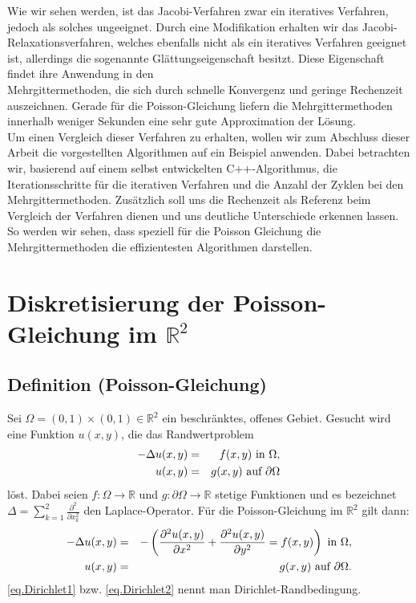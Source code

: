 Wie wir sehen werden, ist das Jacobi-Verfahren zwar ein iteratives Verfahren, jedoch als solches ungeeignet. Durch eine Modifikation erhalten wir das Jacobi-Relaxationsverfahren, welches ebenfalls nicht als ein iteratives Verfahren geeignet ist, allerdings die sogenannte Glättungseigenschaft besitzt. Diese Eigenschaft findet ihre Anwendung in den\\ Mehrgittermethoden, die sich durch schnelle Konvergenz und geringe Rechenzeit auszeichnen. Gerade für die Poisson-Gleichung liefern die Mehrgittermethoden innerhalb weniger Sekunden eine sehr gute Approximation der Lösung.\\
Um einen Vergleich dieser Verfahren zu erhalten, wollen wir zum Abschluss dieser Arbeit die vorgestellten Algorithmen auf ein Beispiel anwenden. Dabei betrachten wir, basierend auf einem selbst entwickelten C++-Algorithmus, die Iterationsschritte für die iterativen Verfahren und die Anzahl der Zyklen bei den Mehrgittermethoden. Zusätzlich soll uns die Rechenzeit als Referenz beim Vergleich der Verfahren dienen und uns deutliche Unterschiede erkennen lassen. So werden wir sehen, dass speziell für die Poisson Gleichung die Mehrgittermethoden die effizientesten Algorithmen darstellen.


\chapter{Diskretisierung der Poisson-Gleichung im $\mathbb{R}^{2}$} \label{c.Diskretisierte Poisson-Gleichung}

\section{Definition (Poisson-Gleichung)}\label{s.Poisson-Gleichung}

Sei $\Omega = (0,1)\times(0,1) \in \mathbb{R}^{2}$ ein beschränktes, offenes Gebiet. Gesucht wird eine Funktion $u(x,y)$, die das Randwertproblem
\begin{eqnarray}
-\Delta u(x,y) &=& f(x,y) \textnormal{ in } \Omega, \\
u(x,y) &=& g(x,y) \textnormal{ auf } \partial \Omega\label{eq.Dirichlet1}
\end{eqnarray}
löst.
Dabei seien $f: \Omega \rightarrow \mathbb{R}$ und $g: \partial\Omega \rightarrow \mathbb{R}$ stetige Funktionen und es bezeichnet \\$\Delta = \sum\limits_{k=1}^{2} \frac {\partial^{2}} {\partial x_{k}^{2}}$ den Laplace-Operator. Für die Poisson-Gleichung im $\mathbb{R}^{2}$ gilt dann:
\begin{eqnarray}
-\Delta u(x,y) &=& - \left( \frac {\partial^{2} u(x,y)} {\partial x^{2}} + \frac {\partial^{2} u(x,y)} {\partial y^{2}} = f(x,y) \right) \textnormal{ in } \Omega, \\
u(x,y) &=& g(x,y) \textnormal{ auf } \partial \Omega.\label{eq.Dirichlet2}
\end{eqnarray}
\autoref{eq.Dirichlet1} bzw. \autoref{eq.Dirichlet2} nennt man Dirichlet-Randbedingung.\\

